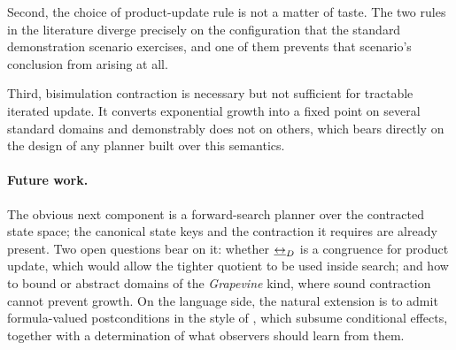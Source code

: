 \documentclass[11pt,a4paper]{article}
\begin{document}
Second, the choice of product-update rule is not a matter of taste. The two rules in the
literature diverge precisely on the configuration that the standard demonstration scenario
exercises, and one of them prevents that scenario's conclusion from arising at all.

Third, bisimulation contraction is necessary but not sufficient for tractable iterated update.
It converts exponential growth into a fixed point on several standard domains and demonstrably
does not on others, which bears directly on the design of any planner built over this
semantics.

\paragraph{Future work.}
The obvious next component is a forward-search planner over the contracted state space; the
canonical state keys and the contraction it requires are already present. Two open questions
bear on it: whether $\mathbin{\underline{\leftrightarrow}_{D}}$ is a congruence for product update, which would allow the
tighter quotient to be used inside search; and how to bound or abstract domains of the
\emph{Grapevine} kind, where sound contraction cannot prevent growth. On the language side, the
natural extension is to admit formula-valued postconditions in the style of
\citet{andersen2012}, which subsume conditional effects, together with a determination
of what observers should learn from them.
\end{document}
